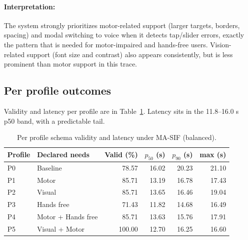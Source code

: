 \documentclass[openany]{book}
\begin{document}
\paragraph{Interpretation:} The system strongly prioritizes motor-related support (larger targets, borders, spacing) and modal switching to voice when it detects tap/slider errors, exactly the pattern that is needed for motor-impaired and hands-free users. Vision-related support (font size and contrast) also appears consistently, but is less prominent than motor support in this trace.


\subsection{Per profile outcomes}
Validity and latency per profile are in Table~\ref{tab:per-profile}. Latency sits in the 11.8–16.0 s p50 band, with a predictable tail.

\begin{table}[H]
\centering
\caption{Per profile schema validity and latency under MA-SIF (balanced).}
\label{tab:per-profile}
\begin{tabular}{l l r r r r}
\toprule
\textbf{Profile} & \textbf{Declared needs} & \textbf{Valid (\%)} & \textbf{$p_{50}$ (s)} & \textbf{$p_{90}$ (s)} & \textbf{max (s)} \\
\midrule
P0 & Baseline & 78.57 & 16.02 & 20.23 & 21.10 \\
P1 & Motor & 85.71 & 13.19 & 16.78 & 17.43 \\
P2 & Visual & 85.71 & 13.65 & 16.46 & 19.04 \\
P3 & Hands free & 71.43 & 11.82 & 14.68 & 16.49 \\
P4 & Motor + Hands free & 85.71 & 13.63 & 15.76 & 17.91 \\
P5 & Visual + Motor & 100.00 & 12.70 & 16.25 & 16.60 \\
\bottomrule
\end{tabular}
\end{table}
\end{document}
